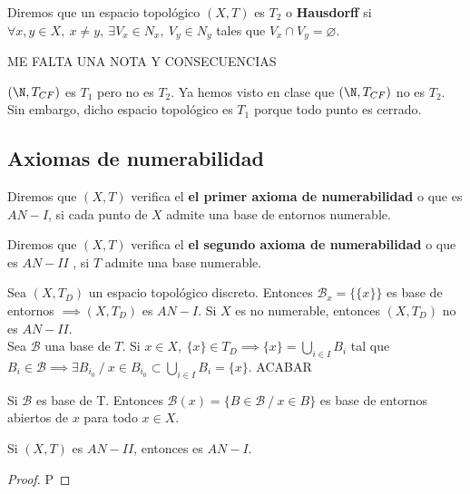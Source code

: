 \begin{ndef}
  Diremos que un espacio topológico $(X,T)$ es $T_2$ o \textbf{Hausdorff} si $\forall x,y \in X,\ x \neq y,\ \exists V_x \in N_x,\ V_y \in N_y$ tales que $V_x \cap V_y = \varnothing$.
\end{ndef}
ME FALTA UNA NOTA Y CONSECUENCIAS

\begin{exmp}
  $(\N,T_{CF})$ es $T_1$ pero no es $T_2$. Ya hemos visto en clase que $(\N,T_{CF})$ no es $T_2$. Sin embargo, dicho espacio topológico es $T_1$ porque todo punto es cerrado.
\end{exmp}

\subsection{Axiomas de numerabilidad}
\begin{ndef}
  Diremos que $(X,T)$ verifica el \textbf{el primer axioma de numerabilidad} o que es $AN-I$, si cada punto de $X$ admite una base de entornos numerable.
\end{ndef}

\begin{ndef}
  Diremos que $(X,T)$ verifica el \textbf{el segundo axioma de numerabilidad} o que es $AN-II$  , si $T$ admite una base numerable.
\end{ndef}

\begin{exmp}
  Sea $(X,T_D)$ un espacio topológico discreto. Entonces $\mathcal{B}_x=\{\{x\}\}$ es base de entornos $\implies (X,T_D)$ es $AN-I$. Si $X$ es no numerable, entonces  $(X,T_D)$ no es $AN-II$.\\

  Sea $\mathcal{B}$ una base de $T$. Si $x \in X,\ \{x\} \in T_D \implies \{x\} = \bigcup_{i \in I}B_i$ tal que $B_i \in \mathcal{B} \implies \exists B_{i_0}\ /\ x \in B_{i_0} \subset \bigcup_{i \in I} B_i = \{x\}$. ACABAR
\end{exmp}

\begin{lema}
  Si $\mathcal{B}$ es base de T. Entonces $\mathcal{B}(x) = \{B \in  \mathcal{B}\ /\ x \in B\}$ es base de entornos abiertos de $x$ para todo $x \in X$.
\end{lema}

\begin{ncor}
  Si $(X,T)$ es $AN-II$, entonces es $AN-I$.
\end{ncor}
\begin{proof}
  P
\end{proof}

